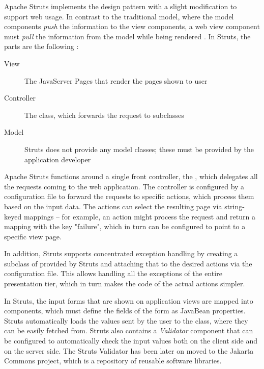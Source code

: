 Apache Struts implements the  design pattern with a slight 
modification to support web usage. In contrast to the traditional 
 model, where the model components \textsl{push} the 
information to the view components, a web  view component 
must \textsl{pull} the information from the model while being rendered 
\citep{j2eeframeworks}. In Struts, the  parts are the 
following \citep{masteringstruts}:

\begin{description}
\item[View] The JavaServer Pages that render the  pages 
shown to user

\item[Controller] The  class, which forwards the 
request to  subclasses

\item[Model] Struts does not provide any model classes; these must be 
provided by the application developer
\end{description}

Apache Struts functions around a single front controller, the 
, which delegates all the requests coming to the 
web application. The controller is configured by a configuration file 
to forward the requests to specific actions, which process them based 
on the input data. The actions can select the resulting page via 
string-keyed mappings -- for example, an action might process the 
request and return a mapping with the key "failure", which in turn can 
be configured to point to a specific view page.

In addition, Struts supports concentrated exception handling by 
creating a subclass of  provided by Struts and 
attaching that to the desired actions via the configuration file. This 
allows handling all the exceptions of the entire presentation tier, 
which in turn makes the code of the actual actions simpler.

In Struts, the  input forms that are shown on application 
views are mapped into  components, which must define 
the fields of the form as JavaBean properties. Struts automatically 
loads the values sent by the user to the  class, 
where they can be easily fetched from. Struts also contains a 
\textsl{Validator} component that can be configured to automatically 
check the input values both on the client side and on the server side. 
The Struts Validator has been later on moved to the Jakarta Commons 
\citep{commons} project, which is a repository of reusable software 
libraries.

